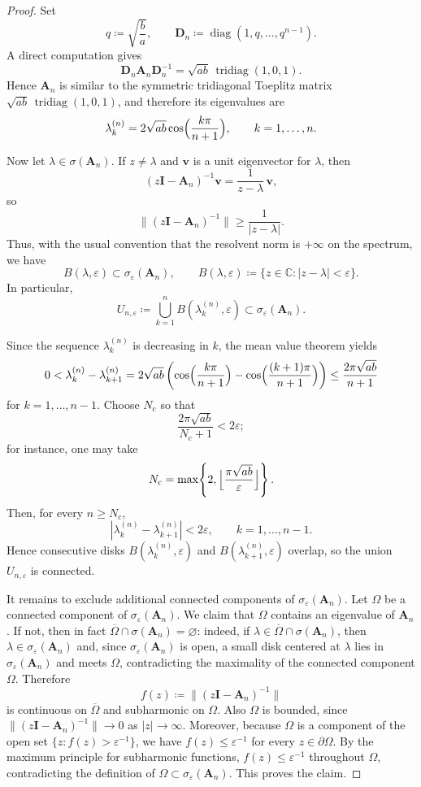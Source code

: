 \documentclass[11pt]{article}
\newcommand{\C}{\mathbb{C}}
\newcommand{\eps}{\varepsilon}
\newcommand{\sig}{\sigma}
\newcommand{\conn}{\mathrm{c}}
\newcommand{\tridiag}{\operatorname{tridiag}}
\newcommand{\matA}{\mathbf{A}}
\newcommand{\matD}{\mathbf{D}}
\newcommand{\matI}{\mathbf{I}}
\begin{document}
\begin{proof}
Set
\[
q\coloneqq \sqrt{\frac{b}{a}},
\qquad
\matD_n\coloneqq \operatorname{diag}(1,q,\dots,q^{n-1}).
\]
A direct computation gives
\[
\matD_n\matA_n\matD_n^{-1}=\sqrt{ab}\,\tridiag(1,0,1).
\]
Hence $\matA_n$ is similar to the symmetric tridiagonal Toeplitz matrix
$\sqrt{ab}\,\tridiag(1,0,1)$, and therefore its eigenvalues are
\[
\lambda_k^{(n)}=2\sqrt{ab}\cos\Bigl(\frac{k\pi}{n+1}\Bigr),
\qquad k=1,\dots,n.
\]

Now let $\lambda\in\sig(\matA_n)$. If $z\neq \lambda$ and $\mathbf{v}$ is a unit eigenvector
for $\lambda$, then
\[
(z\matI-\matA_n)^{-1}\mathbf{v}=\frac{1}{z-\lambda}\,\mathbf{v},
\]
so
\[
\|(z\matI-\matA_n)^{-1}\|
\ge \frac{1}{|z-\lambda|}.
\]
Thus, with the usual convention that the resolvent norm is $+\infty$ on the
spectrum, we have
\[
B(\lambda,\eps)\subset \sig_\eps(\matA_n),
\qquad
B(\lambda,\eps)\coloneqq\{z\in\C:|z-\lambda|<\eps\}.
\]
In particular,
\[
U_{n,\eps}\coloneqq \bigcup_{k=1}^n B(\lambda_k^{(n)},\eps)
\subset \sig_\eps(\matA_n).
\]

Since the sequence $\lambda_k^{(n)}$ is decreasing in $k$, the mean value theorem
yields
\[
0<\lambda_k^{(n)}-\lambda_{k+1}^{(n)}
=2\sqrt{ab}\left(
\cos\Bigl(\frac{k\pi}{n+1}\Bigr)
-\cos\Bigl(\frac{(k+1)\pi}{n+1}\Bigr)
\right)
\le \frac{2\pi\sqrt{ab}}{n+1}
\]
for $k=1,\dots,n-1$. Choose $N_\conn$ so that
\[
\frac{2\pi\sqrt{ab}}{N_\conn+1}<2\eps;
\]
for instance, one may take
\[
N_\conn=\max\!\left\{2,\Bigl\lfloor \frac{\pi\sqrt{ab}}{\eps}\Bigr\rfloor\right\}.
\]
Then, for every $n\ge N_\conn$,
\[
|\lambda_k^{(n)}-\lambda_{k+1}^{(n)}|<2\eps,
\qquad k=1,\dots,n-1.
\]
Hence consecutive disks $B(\lambda_k^{(n)},\eps)$ and
$B(\lambda_{k+1}^{(n)},\eps)$ overlap, so the union $U_{n,\eps}$ is connected.

It remains to exclude additional connected components of $\sig_\eps(\matA_n)$.
Let $\Omega$ be a connected component of $\sig_\eps(\matA_n)$.
We claim that $\Omega$ contains an eigenvalue of $\matA_n$.
If not, then in fact $\overline{\Omega}\cap\sig(\matA_n)=\varnothing$: indeed, if
$\lambda\in\overline{\Omega}\cap\sig(\matA_n)$, then $\lambda\in\sig_\eps(\matA_n)$
and, since $\sig_\eps(\matA_n)$ is open, a small disk centered at $\lambda$ lies
in $\sig_\eps(\matA_n)$ and meets $\Omega$, contradicting the maximality of the
connected component $\Omega$. Therefore
\[
f(z)\coloneqq \|(z\matI-\matA_n)^{-1}\|
\]
is continuous on $\overline{\Omega}$ and subharmonic on $\Omega$. Also $\Omega$ is
bounded, since $\|(z\matI-\matA_n)^{-1}\|\to 0$ as $|z|\to\infty$.
Moreover, because $\Omega$ is a component of the open set
$\{z:f(z)>\eps^{-1}\}$, we have $f(z)\le \eps^{-1}$ for every
$z\in\partial\Omega$. By the maximum principle for subharmonic functions,
$f(z)\le \eps^{-1}$ throughout $\Omega$, contradicting the definition of
$\Omega\subset\sig_\eps(\matA_n)$. This proves the claim.


\end{proof}
\end{document}
